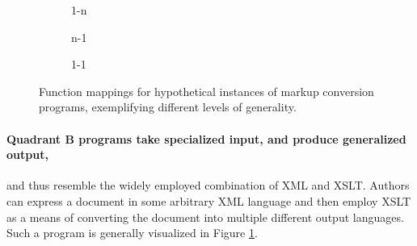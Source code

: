 \documentclass{scrreprt}
\begin{document}
\begin{figure}[h]
\begin{subfigure}{.25\textwidth}
  \caption{1-n}
  \label{fig:workflows-framework-spec-in-gen-out}

\end{subfigure}%
\begin{subfigure}{.25\textwidth}

  \centering


  \caption{n-1}
  \label{fig:workflows-framework-gen-in-spec-out}

\end{subfigure}%
\begin{subfigure}{.25\textwidth}

  \centering


  \caption{1-1}
  \label{fig:workflows-framework-spec-in-spec-out}

\end{subfigure}%

  \caption{Function mappings for hypothetical instances of markup conversion programs, exemplifying different levels of generality.}
  \label{fig:conversion-generality-function-mapping}
\end{figure}





\paragraph{Quadrant B programs take specialized input, and produce generalized output,}
and thus resemble the widely employed combination of XML and XSLT. Authors can express a document in some arbitrary XML language and then employ XSLT as a means of converting the document into multiple different output languages. Such a program is generally visualized in Figure \ref{fig:workflows-framework-spec-in-gen-out}.
\end{document}
